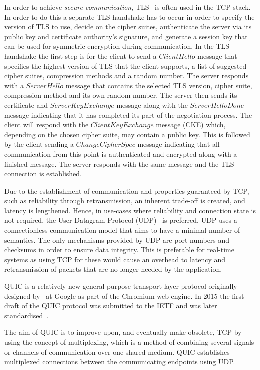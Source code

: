 In order to achieve \textit{secure communication}, TLS~\citep{rescorla_transport_2018} is often used in the TCP stack.
In order to do this a separate TLS handshake has to occur in order to specify the version of TLS to use, decide on the cipher suites, authenticate the server via its public key and certificate authority's signature, and generate a session key that can be used for symmetric encryption during communication.
In the TLS handshake the first step is for the client to send a $ClientHello$ message that specifies the highest version of TLS that the client supports, a list of suggested cipher suites, compression methods and a random number.
The server responds with a $ServerHello$ message that contains the selected TLS version, cipher suite, compression method and its own random number.
The server then sends its certificate and $ServerKeyExchange$ message along with the $ServerHelloDone$ message indicating that it has completed its part of the negotiation process.
The client will respond with the $ClientKeyExchange$ message (CKE) which, depending on the chosen cipher suite, may contain a public key.
This is followed by the client sending a $ChangeCipherSpec$ message indicating that all communication from this point is authenticated and encrypted along with a finished message.
The server responds with the same message and the TLS connection is established.

Due to the establishment of communication and properties guaranteed by TCP, such as reliability through retransmission, an inherent trade-off is created, and latency is lengthened.
Hence, in use-cases where reliability and connection state is not required, the User Datagram Protocol (UDP)~\citep{j_postel_1980} is preferred.
UDP uses a connectionless communication model that aims to have a minimal number of semantics. The only mechanisms provided by UDP are port numbers and checksums in order to ensure data integrity.
This is preferable for real-time systems as using TCP for these would cause an overhead to latency and retransmission of packets that are no longer needed by the application.

QUIC is a relatively new general-purpose transport layer protocol originally designed by~\citet{jim_roskind_2012} at Google as part of the Chromium web engine.
In 2015 the first draft of the QUIC protocol was submitted to the IETF and was later standardised~\citep{iyengar_quic_2021}.

The aim of QUIC is to improve upon, and eventually make obsolete, TCP by using the concept of multiplexing, which is a method of combining several signals or channels of communication over one shared medium.
QUIC establishes multiplexed connections between the communicating endpoints using UDP.



